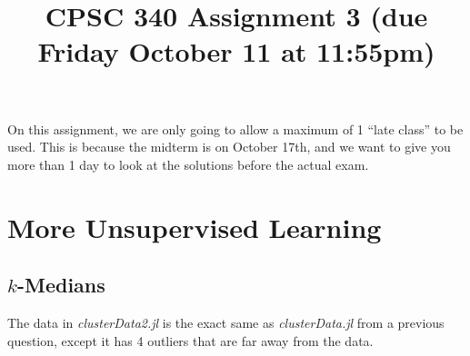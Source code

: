 \documentclass{article}
\def\blu#1{{\color{blu}#1}}
\begin{document}
\title{CPSC 340 Assignment 3 (due Friday October 11 at 11:55pm)}
\author{}
\date{}
\maketitle
\vspace{-4em}

On this assignment, we are only going to allow a \blu{maximum of 1 ``late class''} to be used. This is because the midterm is on October 17th, and we want to give you more than 1 day to look at the solutions before the actual exam.

\section{More Unsupervised Learning}

 \subsection{$k$-Medians}
 
 The data in \emph{clusterData2.jl} is the exact same as \emph{clusterData.jl} from a previous question, except it has 4 outliers that are far away from the data.
 
\end{document}
